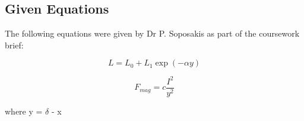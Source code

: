 \subsection*{Given Equations} The following equations were given by Dr P. Soposakis as part of the coursework brief:

\begin{equation} \label{eq:1}
    L = L_0 + L_1 \exp{(-\alpha y)}
\end{equation}

\begin{equation} \label{eq:2}
    F_{mag}=c \frac{I^2}{y^2}
\end{equation}

  \hspace{6cm} where y = $\delta$ - x \\
